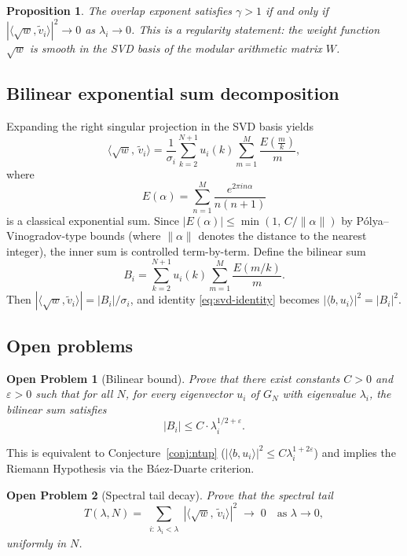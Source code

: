 \documentclass[11pt,a4paper]{article}
\newtheorem{proposition}{Proposition}
\newtheorem{problem}{Open Problem}
\begin{document}
\begin{proposition}\label{prop:gamma-equiv}
The overlap exponent satisfies $\gamma > 1$ if and only if $|\langle \sqrt{w}, \tilde{v}_i \rangle|^2 \to 0$ as $\lambda_i \to 0$. This is a regularity statement: the weight function $\sqrt{w}$ is smooth in the SVD basis of the modular arithmetic matrix $W$.
\end{proposition}

\subsection{Bilinear exponential sum decomposition}

Expanding the right singular projection in the SVD basis yields
\begin{equation}\label{eq:bilinear}
\langle \sqrt{w},\, \tilde{v}_i \rangle = \frac{1}{\sigma_i} \sum_{k=2}^{N+1} u_i(k) \sum_{m=1}^{M} \frac{E\!\left(\frac{m}{k}\right)}{m},
\end{equation}
where
\[
E(\alpha) = \sum_{n=1}^{M} \frac{e^{2\pi i n \alpha}}{n(n+1)}
\]
is a classical exponential sum. Since $|E(\alpha)| \leq \min(1,\, C/\|\alpha\|)$ by P\'olya--Vinogradov-type bounds (where $\|\alpha\|$ denotes the distance to the nearest integer), the inner sum is controlled term-by-term. Define the bilinear sum
\[
B_i = \sum_{k=2}^{N+1} u_i(k) \sum_{m=1}^{M} \frac{E(m/k)}{m}.
\]
Then $|\langle \sqrt{w}, \tilde{v}_i \rangle| = |B_i|/\sigma_i$, and identity \eqref{eq:svd-identity} becomes $|\langle b, u_i \rangle|^2 = |B_i|^2$.

\subsection{Open problems}

\begin{problem}[Bilinear bound]\label{prob:bilinear}
Prove that there exist constants $C > 0$ and $\varepsilon > 0$ such that for all $N$, for every eigenvector $u_i$ of $G_N$ with eigenvalue $\lambda_i$, the bilinear sum satisfies
\[
|B_i| \leq C \cdot \lambda_i^{1/2 + \varepsilon}.
\]
\end{problem}

This is equivalent to Conjecture~\ref{conj:ntup} ($|\langle b, u_i\rangle|^2 \leq C \lambda_i^{1+2\varepsilon}$) and implies the Riemann Hypothesis via the B\'aez-Duarte criterion.

\begin{problem}[Spectral tail decay]\label{prob:tail}
Prove that the spectral tail
\[
T(\lambda, N) = \sum_{\substack{i:\, \lambda_i < \lambda}} |\langle \sqrt{w},\, \tilde{v}_i \rangle|^2 \;\longrightarrow\; 0 \quad \text{as } \lambda \to 0,
\]
uniformly in $N$.
\end{problem}
\end{document}
